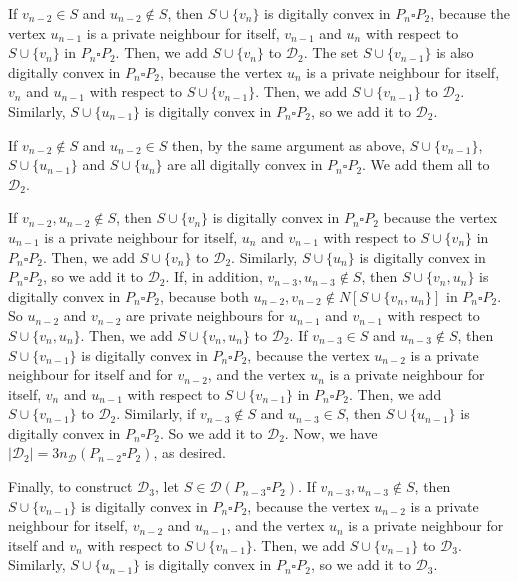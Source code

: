 \documentclass[12pt]{article}
\begin{document}
If $v_{n-2}\in S$ and $u_{n-2}\not\in S$, then $S\cup\{v_n\}$ is digitally convex in $P_n\square P_2$, because the vertex $u_{n-1}$ is a private neighbour for itself, $v_{n-1}$ and $u_n$ with respect to $S\cup\{v_n\}$ in $P_n\square P_2$. Then, we add $S\cup\{v_n\}$ to $\mathscr{D}_2$. The set $S\cup\{v_{n-1}\}$ is also digitally convex in $P_n\square P_2$, because the vertex $u_n$ is a private neighbour for itself, $v_n$ and $u_{n-1}$ with respect to $S\cup\{v_{n-1}\}$. Then, we add $S\cup\{v_{n-1}\}$ to $\mathscr{D}_2$. Similarly, $S\cup\{u_{n-1}\}$ is digitally convex in $P_n\square P_2$, so we add it to $\mathscr{D}_2$. 

If $v_{n-2}\not\in S$ and $u_{n-2}\in S$ then, by the same argument as above, $S\cup\{v_{n-1}\}$, $S\cup\{u_{n-1}\}$ and $S\cup\{u_n\}$ are all digitally convex in $P_n\square P_2$. We add them all to $\mathscr{D}_2$. 

If $v_{n-2},u_{n-2}\not\in S$, then $S\cup\{v_n\}$ is digitally convex in $P_n\square P_2$ because the vertex $u_{n-1}$ is a private neighbour for itself, $u_n$ and $v_{n-1}$ with respect to $S\cup\{v_n\}$ in $P_n\square P_2$. Then, we add $S\cup\{v_n\}$ to $\mathscr{D}_2$. Similarly, $S\cup\{u_n\}$ is digitally convex in $P_n\square P_2$, so we add it to $\mathscr{D}_2$. If, in addition, $v_{n-3},u_{n-3}\not\in S$, then $S\cup\{v_n,u_n\}$ is digitally convex in $P_n\square P_2$, because both $u_{n-2},v_{n-2}\not\in N[S\cup\{v_n,u_n\}]$ in $P_n\square P_2$. So $u_{n-2}$ and $v_{n-2}$ are private neighbours for $u_{n-1}$ and $v_{n-1}$ with respect to $S\cup\{v_n,u_n\}$. Then, we add $S\cup\{v_n,u_n\}$ to $\mathscr{D}_2$. If $v_{n-3}\in S$ and $u_{n-3}\not\in S$, then $S\cup\{v_{n-1}\}$ is digitally convex in $P_n\square P_2$, because the vertex $u_{n-2}$ is a private neighbour for itself and for $v_{n-2}$, and the vertex $u_n$ is a private neighbour for itself, $v_n$ and $u_{n-1}$ with respect to $S\cup\{v_{n-1}\}$ in $P_n \square P_2$. Then, we add $S\cup\{v_{n-1}\}$ to $\mathscr{D}_2$. Similarly, if $v_{n-3}\not\in S$ and $u_{n-3}\in S$, then $S\cup\{u_{n-1}\}$ is digitally convex in $P_n\square P_2$. So we add it to $\mathscr{D}_2$. Now, we have $|\mathscr{D}_2| = 3n_\mathscr{D}(P_{n-2}\square P_2)$, as desired.  

Finally, to construct $\mathscr{D}_3$, let $S\in \mathscr{D}(P_{n-3} \square P_2)$. If $v_{n-3}, u_{n-3}\not\in S$, then $S\cup\{v_{n-1}\}$ is digitally convex in $P_n\square P_2$, because the vertex $u_{n-2}$ is a private neighbour for itself, $v_{n-2}$ and $u_{n-1}$, and the vertex $u_n$ is a private neighbour for itself and $v_n$ with respect to $S\cup\{v_{n-1}\}$. Then, we add $S\cup\{v_{n-1}\}$ to $\mathscr{D}_3$. Similarly, $S\cup\{u_{n-1}\}$ is digitally convex in $P_n\square P_2$, so we add it to $\mathscr{D}_3$. 
\end{document}
